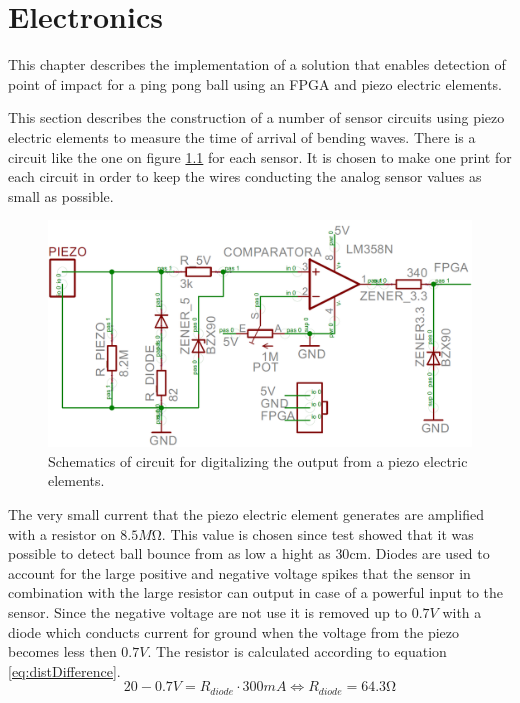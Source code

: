 \chapter{Electronics} %
\label{cha:electronics}

This chapter describes the implementation of a solution that enables detection of point of impact for a ping pong ball using an FPGA and piezo electric elements.

This section describes the construction of a number of sensor circuits using piezo electric elements to measure the time of arrival of bending waves.
There is a circuit like the one on figure \ref{fig:print} for each sensor. It is chosen to make one print for each circuit in order to keep the wires conducting the analog sensor values as small as possible. 
\begin{figure}[htb]
	\centering
	\includegraphics[width=1.\textwidth]{figures/Print}
	\caption{Schematics of circuit for digitalizing the output from a piezo electric elements.}
	\label{fig:print}
\end{figure}
The very small current that the piezo electric element generates are amplified with a resistor on $8.5M\si{\ohm}$. This value is chosen since test showed that it was possible to detect ball bounce from as low a hight as $30\si{\centi\meter}$.
Diodes are used to account for the large positive and negative voltage spikes that the sensor in combination with the large resistor can output in case of a powerful input to the sensor. 
Since the negative voltage are not use it is removed up to $0.7V$ with a diode which conducts current for ground when the voltage from the piezo becomes less then $0.7V$.
The resistor is calculated according to equation \ref{eq:distDifference}.
\begin{equation}
 20 - 0.7 V = R_{diode} \cdot 300mA \Leftrightarrow R_{diode} = 64.3\si{\ohm}
 \label{diodeResistor}
\end{equation}
